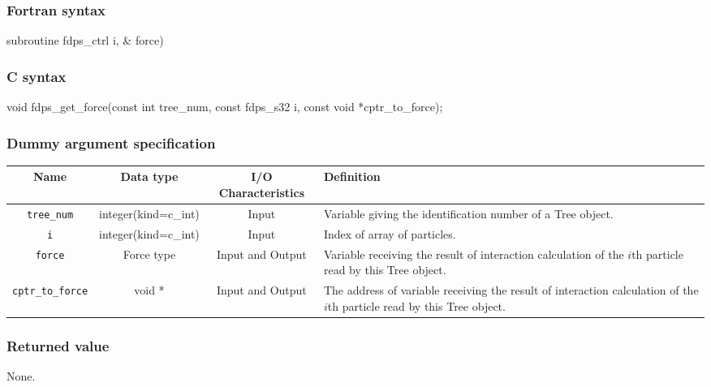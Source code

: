 \subsubsection*{Fortran syntax}
\begin{screen}
\begin{spverbatim}  
subroutine fdps_ctrl%
                               i, &
                               force)
\end{spverbatim}
\end{screen}

\subsubsection*{C syntax}
\begin{screen}
\begin{spverbatim}  
void fdps_get_force(const int tree_num,                                                             
                    const fdps_s32 i,                                                               
                    const void *cptr_to_force);
\end{spverbatim}
\end{screen}

\subsubsection*{Dummy argument specification}
\begin{table}[h]
\begin{tabularx}{\linewidth}{cccX}
\toprule
\rowcolor{Snow2}
Name & Data type & I/O Characteristics & Definition \\
\midrule
\verb|tree_num| & integer(kind=c\_int) & Input & Variable giving the identification number of a Tree object.\\
\verb|i| & integer(kind=c\_int) & Input & Index of array of particles.\\
\verb|force| & Force type & Input and Output & Variable receiving the result of interaction calculation of the $i$th particle read by this Tree object. \\
\verb|cptr_to_force| & void * & Input and Output & The address of variable receiving the result of interaction calculation of the $i$th particle read by this Tree object.\\
\bottomrule
\end{tabularx}
\end{table}

\subsubsection*{Returned value}
None.


